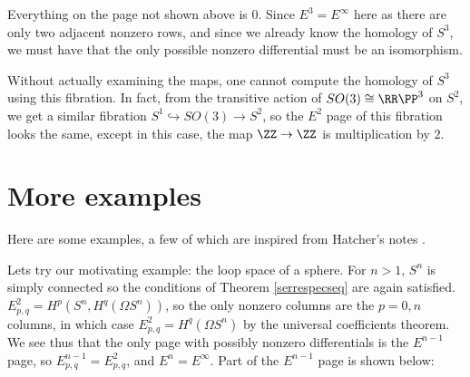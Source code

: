 \documentclass[12pt,oneside]{amsart}
\begin{document}
\begin{center}
\end{center}
Everything on the page not shown above is $0$. Since $E^3 = E^ \infty$ here as there are only two adjacent nonzero rows, and since we already know the homology of $S^3$, we must have that the only possible nonzero differential must be an isomorphism.

Without actually examining the maps, one cannot compute the homology of $S^3$ using this fibration. In fact, from the transitive action of $SO(3) \cong \RR\PP^3$ on $S^2$, we get a similar fibration $S^1 \hookrightarrow SO(3) \rightarrow S^2$, so the $E^2$ page of this fibration looks the same, except in this case, the map $\ZZ \to \ZZ$ is multiplication by $2$.
\section{More examples}

Here are some examples, a few of which are inspired from Hatcher's notes \cite{hatcherssat}.

Lets try our motivating example: the loop space of a sphere. For $n > 1$, $S^n$ is simply connected so the conditions of Theorem \ref{serrespecseq} are again satisfied. $E^2_{p,q} = H^p(S^n,H^q(\Omega S^n))$, so the only nonzero columns are the $p = 0, n$ columns, in which case $E^2_{p,q} = H^q(\Omega S^n)$ by the universal coefficients theorem. We see thus that the only page with possibly nonzero differentials is the $E^{n-1}$ page, so $E^{n-1}_{p,q} = E^2_{p,q}$, and $E^n = E^\infty$. Part of the $E^{n-1}$ page is shown below:
\end{document}
